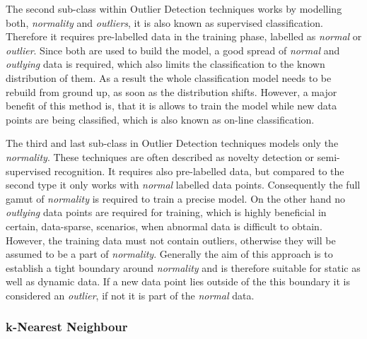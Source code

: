 The second sub-class within Outlier Detection techniques works by modelling both, \emph{normality} and \emph{outliers}, it is also known as supervised classification.
Therefore it requires pre-labelled data in the training phase, labelled as \emph{normal} or \emph{outlier}. Since both are used to build the model, a good spread of \emph{normal} and \emph{outlying} data is required, which also limits the classification to the known distribution of them.
As a result the whole classification model needs to be rebuild from ground up, as soon as the distribution shifts.
However, a major benefit of this method is, that it is allows to train the model while new data points are being classified, which is also known as on-line classification. \parencite{Hodge2004}

The third and last sub-class in Outlier Detection techniques models only the \emph{normality}. These techniques are often described as novelty detection or semi-supervised recognition.
It requires also pre-labelled data, but compared to the second type it only works with \emph{normal} labelled data points. Consequently the full gamut of \emph{normality} is required to train a precise model. On the other hand no \emph{outlying} data points are required for training, which is highly beneficial in certain, data-sparse, scenarios, when abnormal data is difficult to obtain.
However, the training data must not contain outliers, otherwise they will be assumed to be a part of \emph{normality}.
Generally the aim of this approach is to establish a tight boundary around \emph{normality} and is therefore suitable for static as well as dynamic data.
If a new data point lies outside of the this boundary it is considered an \emph{outlier}, if not it is part of the \emph{normal} data. \parencite{Hodge2004}

\newpage
\subsubsection{k-Nearest Neighbour}
\label{sec:background:network:novelty:knn}

